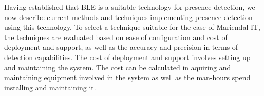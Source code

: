 Having established that BLE is a suitable technology for presence detection, we now describe current methods and techniques implementing presence detection using this technology.
To select a technique suitable for the case of Mariendal-IT, the techniques are evaluated based on ease of configuration and cost of deployment and support, as well as the accuracy and precision in terms of detection capabilities.
The cost of deployment and support involves setting up and maintaining the system. 
The cost can be calculated in aquiring and maintaining equipment involved in the system as well as the man-hours spend installing and maintaining it. 